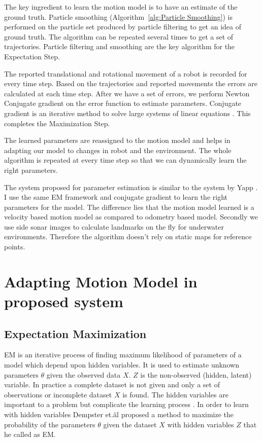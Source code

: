 \documentclass[12pt]{dalcsthesis}
\begin{document}
The key ingredient to learn the motion model is to have an estimate of the ground truth. Particle smoothing (Algorithm~\ref{alg:Particle Smoothing}) is performed on the particle set produced by particle filtering to get an idea of ground truth. The algorithm can be repeated several times to get a set of trajectories. Particle filtering and smoothing are the key algorithm for the Expectation Step. 

The reported translational and rotational movement of a robot is recorded for every time step. Based on the trajectories and reported movements the errors are calculated at each time step. After we have a set of errors, we perform Newton Conjugate gradient on the error function to estimate parameters. Conjugate gradient is an iterative method to solve large systems of linear equations \cite{shewchuk1994introduction}. This completes the Maximization Step.

The learned parameters are reassigned to the motion model and helps in adapting our model to changes in robot and the environment. The whole algorithm is repeated at every time step so that we can dynamically learn the right parameters.

The system proposed for parameter estimation is similar to the system by Yapp \cite{Yap2008}. I use the same EM framework and conjugate gradient to learn the right parameters for the model. The difference lies that the motion model learned is a velocity based motion model as compared to odometry based model. Secondly we use side sonar images to calculate landmarks on the fly for underwater environments. Therefore the algorithm doesn't rely on static maps for reference points.

\section{Adapting Motion Model in proposed system}
\label{adapting the motion model}
\subsection{Expectation Maximization}

EM is an iterative process of finding maximum likelihood of parameters of a model which depend upon hidden variables. It is used to estimate unknown parameters $\theta$ given the observed data $X$. $Z$ is the non-observed (hidden, latent) variable. In practice a complete dataset is not given and only a set of observations or incomplete dataset $X$ is found. The hidden variables are important to a problem but complicate the learning process \cite{russell2003artificial}. In order to learn with hidden variables Dempster et.\~al \cite{dempster1977maximum} proposed a method to maximize the probability of the parameters $\theta$ given the dataset $X$ with hidden variables $Z$ that he called as EM.
\end{document}
